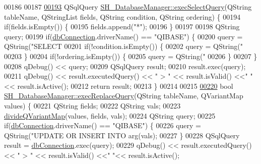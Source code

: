 \begin{DoxyCode}
00186 
00187 
\hypertarget{SH__DatabaseManager_8cpp_source_l00193}{}\hyperlink{classSH__DatabaseManager_ab8f9850cb68444ab9a4e613b36a3b044}{00193} QSqlQuery \hyperlink{classSH__DatabaseManager_ab8f9850cb68444ab9a4e613b36a3b044}{SH\_DatabaseManager::execSelectQuery}(QString tableName, 
      QStringList fields, QString condition, QString ordering) \{
00194     \textcolor{keywordflow}{if}(fields.isEmpty()) \{
00195         fields.append(\textcolor{stringliteral}{"*"});
00196     \}
00197 
00198     QString query;
00199     \textcolor{keywordflow}{if}(\hyperlink{classSH__DatabaseManager_a9291f61c3abbba2c4f1567b1d8325f0e}{dbConnection}.driverName() == \textcolor{stringliteral}{"QIBASE"}) \{
00200         query = QString(\textcolor{stringliteral}{"SELECT %
00201         \textcolor{keywordflow}{if}(!condition.isEmpty()) \{
00202             query = QString(\textcolor{stringliteral}{"%
00203         \}
00204         \textcolor{keywordflow}{if}(!ordering.isEmpty()) \{
00205             query = QString(\textcolor{stringliteral}{"%
00206         \}
00207     \}
00208     qDebug() << query;
00209     QSqlQuery result;
00210     result.exec(query);
00211     qDebug() << result.executedQuery() << \textcolor{stringliteral}{" > "} << result.isValid() <<\textcolor{stringliteral}{" "}<< result.isActive();
00212     \textcolor{keywordflow}{return} result;
00213 \}
00214 
00215 
\hypertarget{SH__DatabaseManager_8cpp_source_l00220}{}\hyperlink{classSH__DatabaseManager_aa42b90708c2fdb89588cb67d2e4f8ad7}{00220} \textcolor{keywordtype}{bool} \hyperlink{classSH__DatabaseManager_aa42b90708c2fdb89588cb67d2e4f8ad7}{SH\_DatabaseManager::execReplaceQuery}(QString tableName, 
      QVariantMap values) \{
00221     QString fields;
00222     QString vals;
00223     \hyperlink{classSH__DatabaseManager_acab8936d9c694610eda1c157a405ead3}{divideQVariantMap}(values, fields, vals);
00224     QString query;
00225     \textcolor{keywordflow}{if}(\hyperlink{classSH__DatabaseManager_a9291f61c3abbba2c4f1567b1d8325f0e}{dbConnection}.driverName() == \textcolor{stringliteral}{"QIBASE"}) \{
00226         query = QString(\textcolor{stringliteral}{"UPDATE OR INSERT INTO %
      arg(vals);
00227     \}
00228     QSqlQuery result = \hyperlink{classSH__DatabaseManager_a9291f61c3abbba2c4f1567b1d8325f0e}{dbConnection}.exec(query);
00229     qDebug() << result.executedQuery() << \textcolor{stringliteral}{" > "} << result.isValid() <<\textcolor{stringliteral}{" "}<< result.isActive();
}}}}
\end{DoxyCode}
